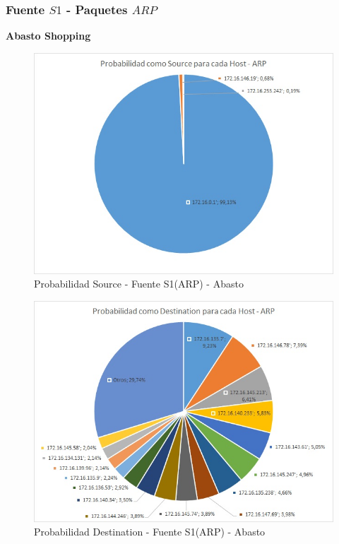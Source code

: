 \newpage
\subsubsection{Fuente $S1$ - Paquetes $ARP$}

\textbf{Abasto Shopping}
\begin{figure}[h!]
\centering
\includegraphics[scale=0.6]{./img/proba_src_abasto.jpg}
\caption{Probabilidad Source - Fuente S1(ARP) - Abasto}
\end{figure}

\begin{figure}[h!]
\centering
\includegraphics[scale=0.6]{./img/proba_dst_abasto.jpg}
\caption{Probabilidad Destination - Fuente S1(ARP) - Abasto}
\end{figure}
\newpage

